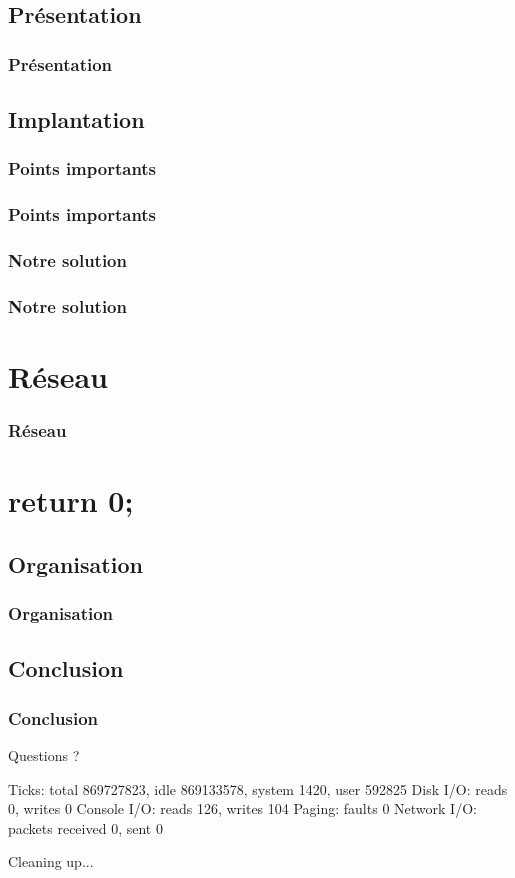 \documentclass{beamer}
\begin{document}
\subsection{Présentation}
\begin{frame}
  \frametitle{Présentation}
\end{frame}

\subsection{Implantation}

\subsubsection{Points importants}
\begin{frame}
  \frametitle{Points importants}
\end{frame}

\subsubsection{Notre solution}
\begin{frame}
  \frametitle{Notre solution}
\end{frame}

\section{Réseau}
\begin{frame}
  \frametitle{Réseau}
\end{frame}


\section*{return 0;}

\subsection{Organisation}
\begin{frame}
  \frametitle{Organisation}
\end{frame}

\subsection{Conclusion}
\begin{frame}[fragile]
  \frametitle{Conclusion}
\begin{verbaterm}[fontsize=\scriptsize]
Questions ?

Ticks: total 869727823, idle 869133578, system 1420, user 592825
Disk I/O: reads 0, writes 0
Console I/O: reads 126, writes 104
Paging: faults 0
Network I/O: packets received 0, sent 0

Cleaning up...
\end{verbaterm}

\end{frame}
\end{document}
